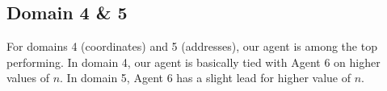\documentclass[titlepage]{article}
\begin{document}
\subsection{Domain 4 \& 5}

For domains 4 (coordinates) and 5 (addresses), our agent is among the top performing. In domain 4, our agent is basically tied with Agent 6 on higher values of $n$. In domain 5, Agent 6 has a slight lead for higher value of $n$.
\end{document}
